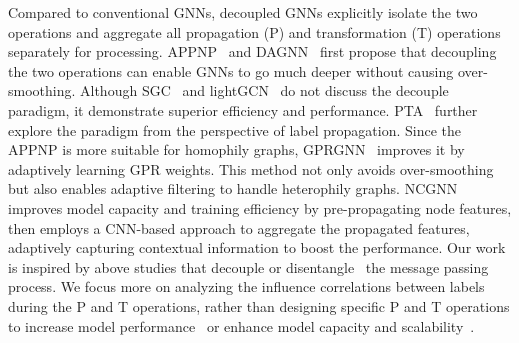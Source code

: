 Compared to conventional GNNs, decoupled GNNs explicitly isolate the two operations and aggregate all propagation (P) and transformation (T) operations separately for processing.
APPNP~\cite{gasteiger2018predict} and DAGNN~\cite{liu2020towards} first propose that decoupling the two operations can enable GNNs to go much deeper without causing over-smoothing. Although SGC~\cite{wu2019simplifying} and lightGCN~\cite{he2020lightgcn} do not discuss the decouple paradigm, it demonstrate superior efficiency and performance. PTA~\cite{dong2021equivalence} further explore the paradigm from the perspective of label propagation. 
Since the APPNP is more suitable for homophily graphs, GPRGNN~\cite{chien2020adaptive} improves it by adaptively learning GPR weights. This method not only avoids over-smoothing but also enables adaptive filtering to handle heterophily graphs.
NCGNN~\cite{chen2024neighborhood} improves model capacity and training efficiency by pre-propagating node features, then employs a CNN-based approach to aggregate the propagated features, adaptively capturing contextual information to boost the performance.
Our work is inspired by above studies that decouple or disentangle~\cite{zhang2022model} the message passing process. 
We focus more on analyzing the influence correlations between labels during the P and T operations, rather than designing specific P and T operations to increase model performance~\cite{gasteiger2018predict,chien2020adaptive,ijcai2022p310} or enhance model capacity and scalability~\cite{chen2024neighborhood}.







